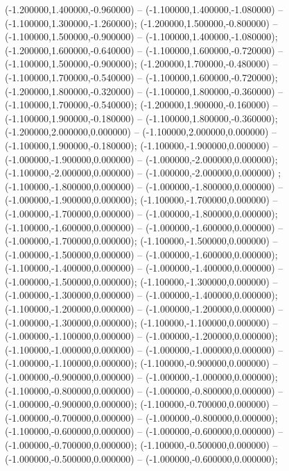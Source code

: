  (-1.200000,1.400000,-0.960000) -- (-1.100000,1.400000,-1.080000) -- (-1.100000,1.300000,-1.260000);
 (-1.200000,1.500000,-0.800000) -- (-1.100000,1.500000,-0.900000) -- (-1.100000,1.400000,-1.080000);
 (-1.200000,1.600000,-0.640000) -- (-1.100000,1.600000,-0.720000) -- (-1.100000,1.500000,-0.900000);
 (-1.200000,1.700000,-0.480000) -- (-1.100000,1.700000,-0.540000) -- (-1.100000,1.600000,-0.720000);
 (-1.200000,1.800000,-0.320000) -- (-1.100000,1.800000,-0.360000) -- (-1.100000,1.700000,-0.540000);
 (-1.200000,1.900000,-0.160000) -- (-1.100000,1.900000,-0.180000) -- (-1.100000,1.800000,-0.360000);
 (-1.200000,2.000000,0.000000) -- (-1.100000,2.000000,0.000000) -- (-1.100000,1.900000,-0.180000);
 (-1.100000,-1.900000,0.000000) -- (-1.000000,-1.900000,0.000000) -- (-1.000000,-2.000000,0.000000);
 (-1.100000,-2.000000,0.000000) -- (-1.000000,-2.000000,0.000000) ;
 (-1.100000,-1.800000,0.000000) -- (-1.000000,-1.800000,0.000000) -- (-1.000000,-1.900000,0.000000);
 (-1.100000,-1.700000,0.000000) -- (-1.000000,-1.700000,0.000000) -- (-1.000000,-1.800000,0.000000);
 (-1.100000,-1.600000,0.000000) -- (-1.000000,-1.600000,0.000000) -- (-1.000000,-1.700000,0.000000);
 (-1.100000,-1.500000,0.000000) -- (-1.000000,-1.500000,0.000000) -- (-1.000000,-1.600000,0.000000);
 (-1.100000,-1.400000,0.000000) -- (-1.000000,-1.400000,0.000000) -- (-1.000000,-1.500000,0.000000);
 (-1.100000,-1.300000,0.000000) -- (-1.000000,-1.300000,0.000000) -- (-1.000000,-1.400000,0.000000);
 (-1.100000,-1.200000,0.000000) -- (-1.000000,-1.200000,0.000000) -- (-1.000000,-1.300000,0.000000);
 (-1.100000,-1.100000,0.000000) -- (-1.000000,-1.100000,0.000000) -- (-1.000000,-1.200000,0.000000);
 (-1.100000,-1.000000,0.000000) -- (-1.000000,-1.000000,0.000000) -- (-1.000000,-1.100000,0.000000);
 (-1.100000,-0.900000,0.000000) -- (-1.000000,-0.900000,0.000000) -- (-1.000000,-1.000000,0.000000);
 (-1.100000,-0.800000,0.000000) -- (-1.000000,-0.800000,0.000000) -- (-1.000000,-0.900000,0.000000);
 (-1.100000,-0.700000,0.000000) -- (-1.000000,-0.700000,0.000000) -- (-1.000000,-0.800000,0.000000);
 (-1.100000,-0.600000,0.000000) -- (-1.000000,-0.600000,0.000000) -- (-1.000000,-0.700000,0.000000);
 (-1.100000,-0.500000,0.000000) -- (-1.000000,-0.500000,0.000000) -- (-1.000000,-0.600000,0.000000);
